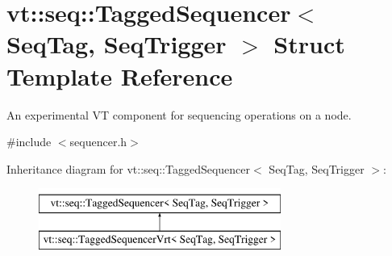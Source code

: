 \hypertarget{structvt_1_1seq_1_1_tagged_sequencer}{}\section{vt\+:\+:seq\+:\+:Tagged\+Sequencer$<$ Seq\+Tag, Seq\+Trigger $>$ Struct Template Reference}
\label{structvt_1_1seq_1_1_tagged_sequencer}


An experimental VT component for sequencing operations on a node.  




{\ttfamily \#include $<$sequencer.\+h$>$}

Inheritance diagram for vt\+:\+:seq\+:\+:Tagged\+Sequencer$<$ Seq\+Tag, Seq\+Trigger $>$\+:\begin{figure}[H]
\begin{center}
\leavevmode
\includegraphics[height=2.000000cm]{structvt_1_1seq_1_1_tagged_sequencer}
\end{center}
\end{figure}
